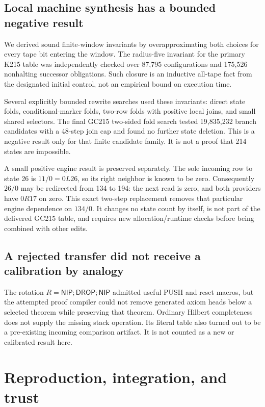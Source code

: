 \documentclass[10pt,a4paper]{article}
\begin{document}
\subsection{Local machine synthesis has a bounded negative result}

We derived sound finite-window invariants by overapproximating both choices
for every tape bit entering the window.  The radius-five invariant for the
primary K215 table was independently checked over 87,795 configurations and
175,526 nonhalting successor obligations.  Such closure is an inductive
all-tape fact from the designated initial control, not an empirical bound on
execution time.

Several explicitly bounded rewrite searches used these invariants: direct
state folds, conditional-marker folds, two-row folds with positive local
joins, and small shared selectors.  The final GC215 two-sided fold search
tested 19,835,232 branch candidates with a 48-step join cap and found no
further state deletion.  This is a negative result only for that finite
candidate family.  It is not a proof that 214 states are impossible.

A small positive engine result is preserved separately.  The sole incoming
row to state 26 is $11/0=0L26$, so its right neighbor is known to be zero.
Consequently $26/0$ may be redirected from 134 to 194: the next read is zero,
and both providers have $0R17$ on zero.  This exact two-step replacement
removes that particular engine dependence on $134/0$.  It changes no state
count by itself, is not part of the delivered GC215 table, and requires new
allocation/runtime checks before being combined with other edits.

\subsection{A rejected transfer did not receive a calibration by analogy}

The rotation $R=\mathsf{NIP};\mathsf{DROP};\mathsf{NIP}$ admitted useful
PUSH and reset macros, but the attempted proof compiler could not remove
generated axiom heads below a selected theorem while preserving that theorem.
Ordinary Hilbert completeness does not supply the missing stack operation.
Its literal table also turned out to be a pre-existing incoming comparison
artifact.  It is not counted as a new or calibrated result here.

\section{Reproduction, integration, and trust}
\end{document}
